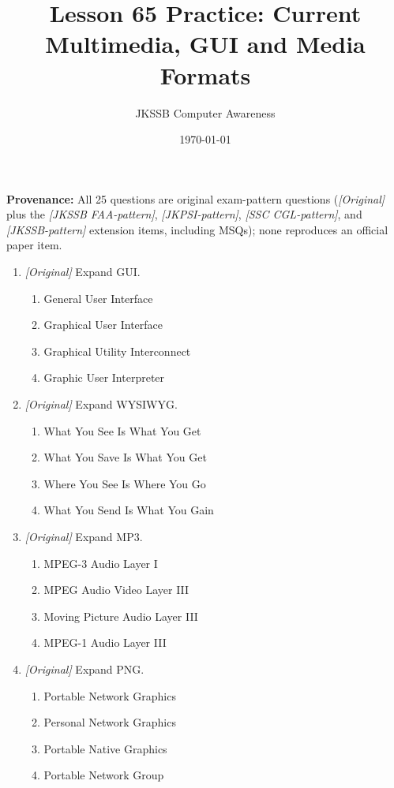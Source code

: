 \documentclass[11pt]{article}
\title{Lesson 65 Practice: Current Multimedia, GUI and Media Formats}
\author{JKSSB Computer Awareness}
\date{\today}
\begin{document}
\maketitle
\noindent\textbf{Provenance:} All 25 questions are original exam-pattern questions (\textit{[Original]} plus the \textit{[JKSSB FAA-pattern]}, \textit{[JKPSI-pattern]}, \textit{[SSC CGL-pattern]}, and \textit{[JKSSB-pattern]} extension items, including MSQs); none reproduces an official paper item.

\begin{enumerate}[label=\textbf{Q\arabic*.}, leftmargin=*]
\item \textit{[Original]} Expand GUI.
  \begin{enumerate}[label=\Alph*.]
    \item General User Interface
    \item Graphical User Interface
    \item Graphical Utility Interconnect
    \item Graphic User Interpreter
  \end{enumerate}
\item \textit{[Original]} Expand WYSIWYG.
  \begin{enumerate}[label=\Alph*.]
    \item What You See Is What You Get
    \item What You Save Is What You Get
    \item Where You See Is Where You Go
    \item What You Send Is What You Gain
  \end{enumerate}
\item \textit{[Original]} Expand MP3.
  \begin{enumerate}[label=\Alph*.]
    \item MPEG-3 Audio Layer I
    \item MPEG Audio Video Layer III
    \item Moving Picture Audio Layer III
    \item MPEG-1 Audio Layer III
  \end{enumerate}
\item \textit{[Original]} Expand PNG.
  \begin{enumerate}[label=\Alph*.]
    \item Portable Network Graphics
    \item Personal Network Graphics
    \item Portable Native Graphics
    \item Portable Network Group

\end{enumerate}
\end{enumerate}
\end{document}
